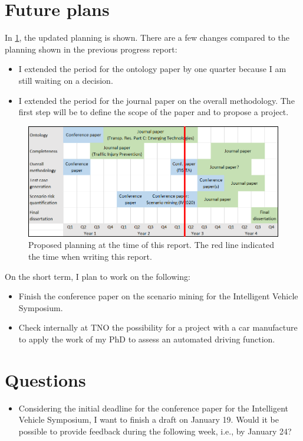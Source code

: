 \documentclass[10pt,final,a4paper,oneside,onecolumn]{article}
\begin{document}
\section{Future plans}

In \cref{fig:planning}, the updated planning is shown. There are a few changes compared to the planning shown in the previous progress report:
\begin{itemize}
	\item I extended the period for the ontology paper by one quarter because I am still waiting on a decision. 
	\item I extended the period for the journal paper on the overall methodology. The first step will be to define the scope of the paper and to propose a project. 
\end{itemize}

\begin{figure}[t]
	\centering
	\includegraphics[width=\linewidth]{planning.png}
	\caption{Proposed planning at the time of this report. The red line indicated the time when writing this report.}
	\label{fig:planning}
\end{figure}

On the short term, I plan to work on the following:
\begin{itemize}
	\item Finish the conference paper on the scenario mining for the Intelligent Vehicle Symposium.
	\item Check internally at TNO the possibility for a project with a car manufacture to apply the work of my PhD to assess an automated driving function.
\end{itemize}

\section{Questions}

\begin{itemize}
	\item Considering the initial deadline for the conference paper for the Intelligent Vehicle Symposium, I want to finish a draft on January 19. Would it be possible to provide feedback during the following week, i.e., by January 24?
\end{itemize}


\printbibliography

\clearpage

\end{document}

